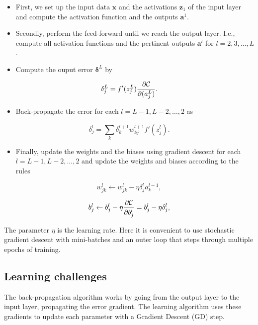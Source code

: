 \documentclass[%
oneside,                 %
final,                   %
10pt]{article}
\newenvironment{summary_mdfboxadmon}[1][]{
\begin{summary_mdfboxmdframed}[frametitle=#1]
}
{
\end{summary_mdfboxmdframed}
}
\begin{document}
\begin{summary_mdfboxadmon}[Summary]
\begin{itemize}
\item First, we set up the input data $\boldsymbol{x}$ and the activations $\boldsymbol{z}_1$ of the input layer and compute the activation function and the outputs $\boldsymbol{a}^1$.

\item Secondly, perform the feed-forward until we reach the output layer. I.e., compute all activation functions and the pertinent outputs $\boldsymbol{a}^l$ for $l=2,3,\dots,L$.

\item Compute the ouput error $\boldsymbol{\delta}^L$ by
\end{itemize}

\noindent
\[
\delta_j^L = f'(z_j^L)\frac{\partial {\cal C}}{\partial (a_j^L)}.
\]

\begin{itemize}
\item Back-propagate the error for each $l=L-1,L-2,\dots,2$ as
\end{itemize}

\noindent
\[
\delta_j^l = \sum_k \delta_k^{l+1}w_{kj}^{l+1}f'(z_j^l).
\]

\begin{itemize}
\item Finally, update the weights and the biases using gradient descent for each $l=L-1,L-2,\dots,2$ and update the weights and biases according to the rules
\end{itemize}

\noindent
\[
w_{jk}^l\leftarrow  w_{jk}^l- \eta \delta_j^la_k^{l-1},
\]

\[
b_j^l \leftarrow b_j^l-\eta \frac{\partial {\cal C}}{\partial b_j^l}=b_j^l-\eta \delta_j^l,
\]
\end{summary_mdfboxadmon} %



The parameter $\eta$ is the learning rate.
Here it is convenient to use stochastic gradient descent with mini-batches and an outer loop that steps through multiple epochs of training.


\subsection{Learning challenges}

The back-propagation algorithm works by going from
the output layer to the input layer, propagating the error gradient. The learning algorithm uses these
gradients to update each parameter with a Gradient Descent (GD) step.
\end{document}
